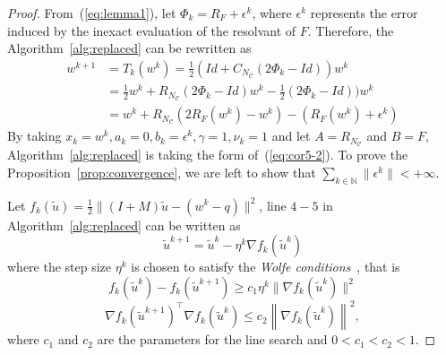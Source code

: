 \documentclass[10pt]{article} %
\begin{document}
\begin{proof}
From~(\ref{eq:lemma1}), let $\Phi_k = R_F + \epsilon^k$, where $\epsilon^k$ represents the error induced by the inexact evaluation of the resolvant of $F$.
Therefore, the Algorithm~\ref{alg:replaced} can be rewritten as 
$$
\begin{aligned}
w^{k+1}  &= T_k(w^k) = \frac{1}{2}(Id + C_{N_\mathcal{C}}(2\Phi_k -Id))w^k\\
&= \frac{1}{2}w^k + R_{N_\mathcal{C}}(2\Phi_k -Id)w^k - \frac{1}{2}(2\Phi_k -Id))w^k\\
&= w^k + R_{N_\mathcal{C}}\left(2R_F(w^k) - w^k\right) - \left(R_F(w^k) + \epsilon^k\right)
\end{aligned}
$$
By taking $x_{k} = w^k, a_k=0, b_k=\epsilon^k, \gamma=1, \nu_k=1$ and let $A=R_{N_\mathcal{C}}$ and $B=F$, Algorithm~\ref{alg:replaced} is taking the form of~(\ref{eq:cor5-2}).
To prove the Proposition~\ref{prop:convergence}, we are left to show that $\sum_{k\in\mathbb{N}} \|\epsilon^k\|<+\infty$.

Let $f_k(\tilde{u}) = \frac{1}{2}\|(I+M)\tilde{u} -(w^k-q)\|^2$, line $4-5$ in Algorithm~\ref{alg:replaced} can be written as 
$$
\tilde{u}^{k+1} = \tilde{u}^k - \eta^k \nabla f_k(\tilde{u}^k)
$$
where the step size $\eta^k$ is chosen to satisfy the \textit{Wolfe conditions}~\citep{nocedal1999numerical}, that is 
\begin{equation}
\label{eq:line_search1}
    f_k(\tilde{u}^k) - f_k(\tilde{u}^{k+1}) \geq c_1 \eta^k \|\nabla f_k(\tilde{u}^k)\|^2
\end{equation}
\begin{equation}
\label{eq:line_search2}
    \nabla f_k(\tilde{u}^{k+1})^\top \nabla f_k(\tilde{u}^k) \leq c_2 \left\|\nabla f_k(\tilde{u}^k)\right\|^2,
\end{equation}
where $c_1$ and $c_2$ are the parameters for the line search and $0<c_1<c_2<1$.


\end{proof}
\end{document}
